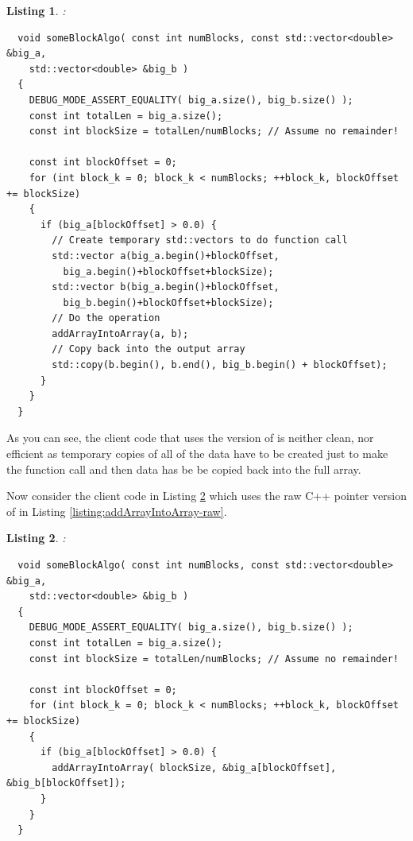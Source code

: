 \documentclass[pdf,ps2pdf,11pt]{SANDreport}
\newtheorem{listing}{Listing}
\begin{document}
\begin{listing}:\\
\label{listing:someBlockAlgo-std-vector}
{\small\begin{verbatim}
  void someBlockAlgo( const int numBlocks, const std::vector<double> &big_a,
    std::vector<double> &big_b )
  {
    DEBUG_MODE_ASSERT_EQUALITY( big_a.size(), big_b.size() );
    const int totalLen = big_a.size();
    const int blockSize = totalLen/numBlocks; // Assume no remainder!
    
    const int blockOffset = 0;
    for (int block_k = 0; block_k < numBlocks; ++block_k, blockOffset += blockSize)
    {
      if (big_a[blockOffset] > 0.0) {
        // Create temporary std::vectors to do function call
        std::vector a(big_a.begin()+blockOffset,
          big_a.begin()+blockOffset+blockSize);
        std::vector b(big_a.begin()+blockOffset,
          big_b.begin()+blockOffset+blockSize);
        // Do the operation
        addArrayIntoArray(a, b);
        // Copy back into the output array
        std::copy(b.begin(), b.end(), big_b.begin() + blockOffset);
      }
    }
  }
\end{verbatim}}
\end{listing}

As you can see, the client code that uses the {}
version of {} is neither clean, nor
efficient as temporary copies of all of the data have to be created
just to make the function call and then data has be be copied back
into the full array.

Now consider the client code in Listing
{}\ref{listing:someBlockAlgo-std-vector-raw-ptr} which uses the raw C++
pointer version of {} in Listing
{}\ref{listing:addArrayIntoArray-raw}.

\begin{listing}:\\
\label{listing:someBlockAlgo-std-vector-raw-ptr}
{\small\begin{verbatim}
  void someBlockAlgo( const int numBlocks, const std::vector<double> &big_a,
    std::vector<double> &big_b )
  {
    DEBUG_MODE_ASSERT_EQUALITY( big_a.size(), big_b.size() );
    const int totalLen = big_a.size();
    const int blockSize = totalLen/numBlocks; // Assume no remainder!
    
    const int blockOffset = 0;
    for (int block_k = 0; block_k < numBlocks; ++block_k, blockOffset += blockSize)
    {
      if (big_a[blockOffset] > 0.0) {
        addArrayIntoArray( blockSize, &big_a[blockOffset], &big_b[blockOffset]);
      }
    }
  }
\end{verbatim}}
\end{listing}
\end{document}
